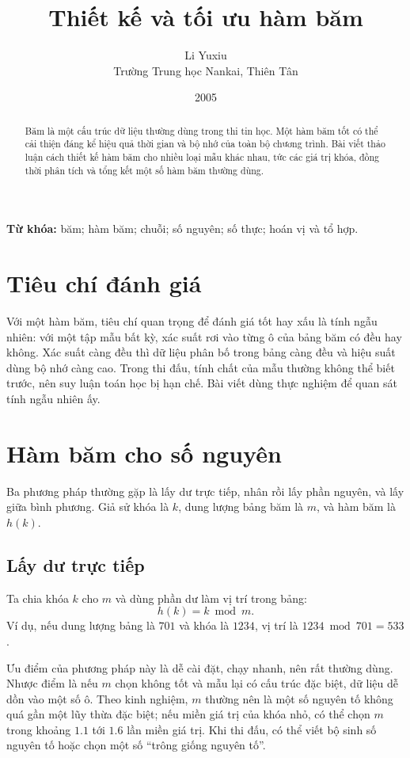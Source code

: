 \documentclass[11pt]{article}
\title{Thiết kế và tối ưu hàm băm}
\author{Li Yuxiu\\Trường Trung học Nankai, Thiên Tân}
\date{2005}
\begin{document}
\maketitle


\renewcommand{\abstractname}{Tóm tắt}
\begin{abstract}
Băm là một cấu trúc dữ liệu thường dùng trong thi tin học. Một hàm băm tốt có
thể cải thiện đáng kể hiệu quả thời gian và bộ nhớ của toàn bộ chương trình.
Bài viết thảo luận cách thiết kế hàm băm cho nhiều loại mẫu khác nhau, tức các
giá trị khóa, đồng thời phân tích và tổng kết một số hàm băm thường dùng.
\end{abstract}

\noindent\textbf{Từ khóa:} băm; hàm băm; chuỗi; số nguyên; số thực; hoán vị và
tổ hợp.

\section{Tiêu chí đánh giá}

Với một hàm băm, tiêu chí quan trọng để đánh giá tốt hay xấu là tính ngẫu
nhiên: với một tập mẫu bất kỳ, xác suất rơi vào từng ô của bảng băm có đều
hay không. Xác suất càng đều thì dữ liệu phân bố trong bảng càng đều và hiệu
suất dùng bộ nhớ càng cao. Trong thi đấu, tính chất của mẫu thường không thể
biết trước, nên suy luận toán học bị hạn chế. Bài viết dùng thực nghiệm để
quan sát tính ngẫu nhiên ấy.

\section{Hàm băm cho số nguyên}

Ba phương pháp thường gặp là lấy dư trực tiếp, nhân rồi lấy phần nguyên, và
lấy giữa bình phương. Giả sử khóa là $k$, dung lượng bảng băm là $m$, và hàm
băm là $h(k)$.

\subsection{Lấy dư trực tiếp}

Ta chia khóa $k$ cho $m$ và dùng phần dư làm vị trí trong bảng:
\[
  h(k)=k\bmod m.
\]
Ví dụ, nếu dung lượng bảng là $701$ và khóa là $1234$, vị trí là
$1234\bmod 701=533$.

Ưu điểm của phương pháp này là dễ cài đặt, chạy nhanh, nên rất thường dùng.
Nhược điểm là nếu $m$ chọn không tốt và mẫu lại có cấu trúc đặc biệt, dữ liệu
dễ dồn vào một số ô. Theo kinh nghiệm, $m$ thường nên là một số nguyên tố
không quá gần một lũy thừa đặc biệt; nếu miền giá trị của khóa nhỏ, có thể
chọn $m$ trong khoảng $1.1$ tới $1.6$ lần miền giá trị. Khi thi đấu, có thể
viết bộ sinh số nguyên tố hoặc chọn một số ``trông giống nguyên tố''.
\end{document}

